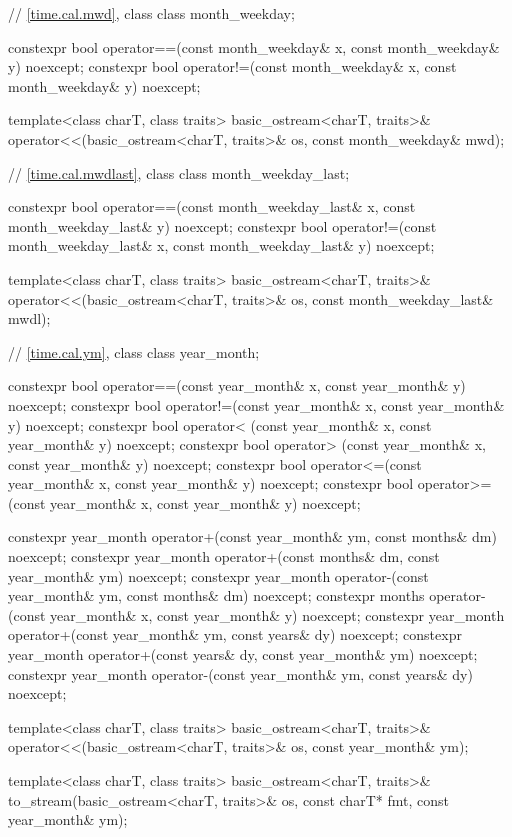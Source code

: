\begin{codeblock}
{{    // \ref{time.cal.mwd}, class 
    class month_weekday;

    constexpr bool operator==(const month_weekday& x, const month_weekday& y) noexcept;
    constexpr bool operator!=(const month_weekday& x, const month_weekday& y) noexcept;

    template<class charT, class traits>
      basic_ostream<charT, traits>&
        operator<<(basic_ostream<charT, traits>& os, const month_weekday& mwd);

    // \ref{time.cal.mwdlast}, class 
    class month_weekday_last;

    constexpr bool operator==(const month_weekday_last& x, const month_weekday_last& y) noexcept;
    constexpr bool operator!=(const month_weekday_last& x, const month_weekday_last& y) noexcept;

    template<class charT, class traits>
      basic_ostream<charT, traits>&
        operator<<(basic_ostream<charT, traits>& os, const month_weekday_last& mwdl);

    // \ref{time.cal.ym}, class 
    class year_month;

    constexpr bool operator==(const year_month& x, const year_month& y) noexcept;
    constexpr bool operator!=(const year_month& x, const year_month& y) noexcept;
    constexpr bool operator< (const year_month& x, const year_month& y) noexcept;
    constexpr bool operator> (const year_month& x, const year_month& y) noexcept;
    constexpr bool operator<=(const year_month& x, const year_month& y) noexcept;
    constexpr bool operator>=(const year_month& x, const year_month& y) noexcept;

    constexpr year_month operator+(const year_month& ym, const months& dm) noexcept;
    constexpr year_month operator+(const months& dm, const year_month& ym) noexcept;
    constexpr year_month operator-(const year_month& ym, const months& dm) noexcept;
    constexpr months operator-(const year_month& x, const year_month& y) noexcept;
    constexpr year_month operator+(const year_month& ym, const years& dy) noexcept;
    constexpr year_month operator+(const years& dy, const year_month& ym) noexcept;
    constexpr year_month operator-(const year_month& ym, const years& dy) noexcept;

    template<class charT, class traits>
      basic_ostream<charT, traits>&
        operator<<(basic_ostream<charT, traits>& os, const year_month& ym);

    template<class charT, class traits>
      basic_ostream<charT, traits>&
        to_stream(basic_ostream<charT, traits>& os, const charT* fmt, const year_month& ym);

}}
\end{codeblock}
